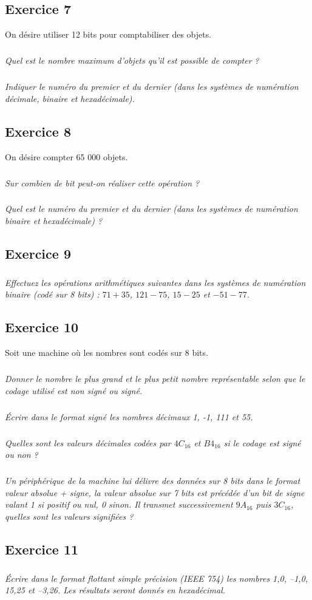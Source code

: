 \documentclass[10pt,fleqn]{article} %
\begin{document}
\begin{multicols}{2}
\subsection*{Exercice 7}
\setcounter{subparagraph}{0}
On désire utiliser 12 bits pour comptabiliser des objets.
\subparagraph{}\textit{Quel est le nombre maximum d’objets qu’il est possible de compter ?}
\subparagraph{}\textit{Indiquer le numéro du premier et du dernier (dans les systèmes de numération décimale, binaire et hexadécimale).}

\subsection*{Exercice 8}
\setcounter{subparagraph}{0}
On désire compter 65 000 objets.
\subparagraph{}\textit{Sur combien de bit peut-on réaliser cette opération ? }
\subparagraph{}\textit{Quel est le numéro du premier et du dernier (dans les systèmes de numération binaire et hexadécimale) ?}

\subsection*{Exercice 9}
\setcounter{subparagraph}{0}
\subparagraph{}\textit{Effectuez les opérations arithmétiques suivantes dans les systèmes de numération binaire (codé sur 8 bits) : $71+35$, $121-75$, $15-25$ et $- 51 - 77$.}

\subsection*{Exercice 10}
\setcounter{subparagraph}{0}
Soit une machine où les nombres sont codés sur 8 bits.
\subparagraph{}\textit{Donner le nombre le plus grand et le plus petit nombre représentable selon que le codage utilisé est non signé ou signé. }
\subparagraph{}\textit{Écrire dans le format signé les nombres décimaux 1, -1, 111 et 55.}
\subparagraph{}\textit{Quelles sont  les valeurs décimales codées par $4C_{16}$ et $B4_{16}$ si le codage est signé ou non ?}
\subparagraph{}\textit{Un périphérique de la machine lui délivre des données sur 8 bits dans le format valeur absolue + signe, la valeur absolue sur 7 bits est précédée d’un bit de signe valant 1 si positif ou nul, 0 sinon. Il transmet successivement $9A_{16}$ puis $3C_{16}$, quelles sont les valeurs signifiées ? }

\subsection*{Exercice 11}
\setcounter{subparagraph}{0}
\subparagraph*{}\textit{Écrire dans le format flottant simple précision (IEEE 754) les nombres 
1,0,  	–1,0,  	15,25  et –3,26. Les résultats seront donnés en hexadécimal.}


\end{multicols}
\end{document}
